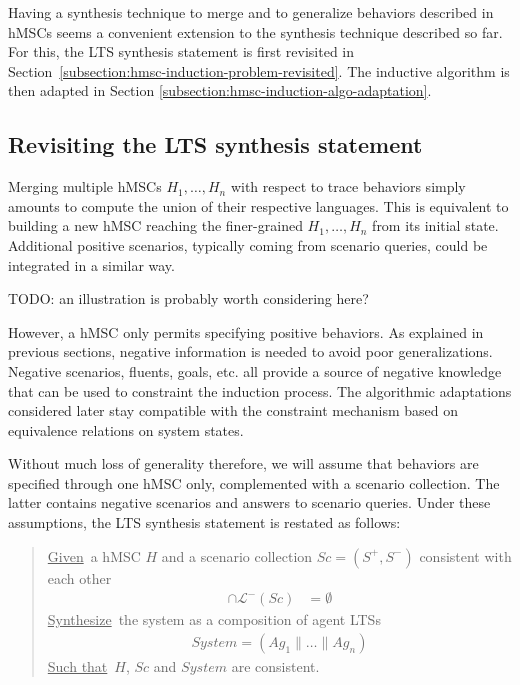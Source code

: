 Having a synthesis technique to merge and to generalize behaviors described in hMSCs seems a convenient extension to the synthesis technique described so far. For this, the LTS synthesis statement is first revisited in Section~\ref{subsection:hmsc-induction-problem-revisited}. The inductive algorithm is then adapted in Section \ref{subsection:hmsc-induction-algo-adaptation}.

\subsection{Revisiting the LTS synthesis statement\label{subsection:hmsc-induction-problem-revisited}}

Merging multiple hMSCs $H_1,\ldots,H_n$ with respect to trace behaviors simply amounts to compute the union of their respective languages. This is equivalent to building a new hMSC reaching the finer-grained $H_1,\ldots,H_n$ from its initial state. Additional positive scenarios, typically coming from scenario queries, could be integrated in a similar way.

TODO: an illustration is probably worth considering here?

However, a hMSC only permits specifying positive behaviors. As explained in previous sections, negative information is needed to avoid poor generalizations. Negative scenarios, fluents, goals, etc. all provide a source of negative knowledge that can be used to constraint the induction process. The algorithmic adaptations considered later stay compatible with the constraint mechanism based on equivalence relations on system states.

Without much loss of generality therefore, we will assume that behaviors are specified through one hMSC only, complemented with a scenario collection. The latter contains negative scenarios and answers to scenario queries. Under these assumptions, the LTS synthesis statement is restated as follows: 

\begin{quote}
\underline{Given}~a hMSC $H$ and a scenario collection $Sc = (S^+,S^-)$ consistent with each other
\begin{align*}
[\mathcal{L}^+(Sc) \cup \mathcal{L}(H)] \cap \mathcal{L}^-(Sc) &= \emptyset
\end{align*}
\underline{Synthesize}~the system as a composition of agent LTSs
\begin{align*}
System = (Ag_1 \parallel \ldots \parallel Ag_n)
\end{align*}
\underline{Such that}~$H$, $Sc$ and $System$ are consistent.
\end{quote}

